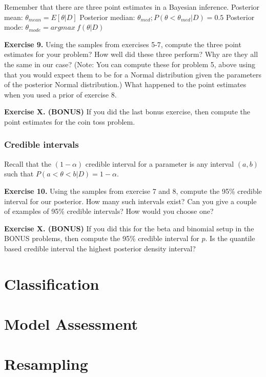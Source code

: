 \documentclass[
]{book}
\begin{document}
Remember that there are three point estimates in a Bayesian inference.
Posterior mean: \(\theta_{mean} = E[\theta|D]\)
Posterior median: \(\theta_{med}; P(\theta < \theta_{med} | D) = 0.5\)
Posterior mode: \(\theta_{mode} = argmax~f(\theta | D)\)

\textbf{Exercise 9.} Using the samples from exercises 5-7, compute the three point estimates for your problem? How well did these three perform? Why are they all the same in our case? (Note: You can compute these for problem 5, above using that you would expect them to be for a Normal distribution given the parameters of the posterior Normal distribution.) What happened to the point estimates when you used a prior of exercise 8.

\textbf{Exercise X. (BONUS)} If you did the last bonus exercise, then compute the point estimates for the coin toss problem.

\hypertarget{credible-intervals}{%
\subsection{Credible intervals}\label{credible-intervals}}

Recall that the \((1-\alpha)\) credible interval for a parameter is any interval \((a, b)\) such that \(P(a < \theta < b | D) = 1-\alpha\).

\textbf{Exercise 10.} Using the samples from exercise 7 and 8, compute the 95\% credible interval for our posterior. How many such intervals exist? Can you give a couple of examples of 95\% credible intervals? How would you choose one?

\textbf{Exercise X. (BONUS)} If you did this for the beta and binomial setup in the BONUS problems, then compute the 95\% credible interval for \(p\). Is the quantile based credible interval the highest posterior density interval?

\hypertarget{classification}{%
\chapter{Classification}\label{classification}}

\hypertarget{model-assessment}{%
\chapter{Model Assessment}\label{model-assessment}}

\hypertarget{resampling}{%
\chapter{Resampling}\label{resampling}}
\end{document}
